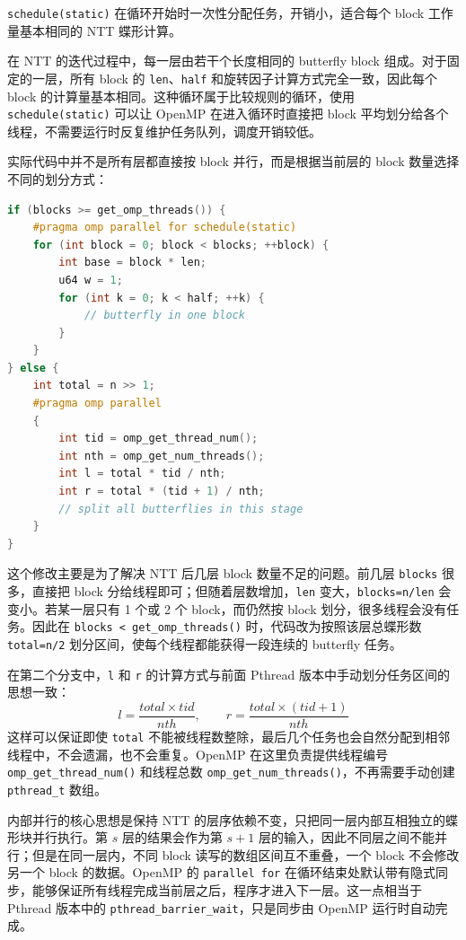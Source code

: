 \documentclass[a4paper]{article}
\begin{document}
\texttt{schedule(static)} 在循环开始时一次性分配任务，开销小，适合每个 block 工作量基本相同的 NTT 蝶形计算。

在 NTT 的迭代过程中，每一层由若干个长度相同的 butterfly block 组成。对于固定的一层，所有 block 的 \texttt{len}、\texttt{half} 和旋转因子计算方式完全一致，因此每个 block 的计算量基本相同。这种循环属于比较规则的循环，使用 \texttt{schedule(static)} 可以让 OpenMP 在进入循环时直接把 block 平均划分给各个线程，不需要运行时反复维护任务队列，调度开销较低。

实际代码中并不是所有层都直接按 block 并行，而是根据当前层的 block 数量选择不同的划分方式：

\begin{lstlisting}[title=根据 block 数量选择并行粒度,frame=trbl,language={C++}]
if (blocks >= get_omp_threads()) {
    #pragma omp parallel for schedule(static)
    for (int block = 0; block < blocks; ++block) {
        int base = block * len;
        u64 w = 1;
        for (int k = 0; k < half; ++k) {
            // butterfly in one block
        }
    }
} else {
    int total = n >> 1;
    #pragma omp parallel
    {
        int tid = omp_get_thread_num();
        int nth = omp_get_num_threads();
        int l = total * tid / nth;
        int r = total * (tid + 1) / nth;
        // split all butterflies in this stage
    }
}
\end{lstlisting}

这个修改主要是为了解决 NTT 后几层 block 数量不足的问题。前几层 \texttt{blocks} 很多，直接把 block 分给线程即可；但随着层数增加，\texttt{len} 变大，\texttt{blocks=n/len} 会变小。若某一层只有 1 个或 2 个 block，而仍然按 block 划分，很多线程会没有任务。因此在 \texttt{blocks < get\_omp\_threads()} 时，代码改为按照该层总蝶形数 \texttt{total=n/2} 划分区间，使每个线程都能获得一段连续的 butterfly 任务。

在第二个分支中，\texttt{l} 和 \texttt{r} 的计算方式与前面 Pthread 版本中手动划分任务区间的思想一致：
\[
l=\frac{total\times tid}{nth},\qquad r=\frac{total\times(tid+1)}{nth}
\]
这样可以保证即使 \texttt{total} 不能被线程数整除，最后几个任务也会自然分配到相邻线程中，不会遗漏，也不会重复。OpenMP 在这里负责提供线程编号 \texttt{omp\_get\_thread\_num()} 和线程总数 \texttt{omp\_get\_num\_threads()}，不再需要手动创建 \texttt{pthread\_t} 数组。

内部并行的核心思想是保持 NTT 的层序依赖不变，只把同一层内部互相独立的蝶形块并行执行。第 $s$ 层的结果会作为第 $s+1$ 层的输入，因此不同层之间不能并行；但是在同一层内，不同 block 读写的数组区间互不重叠，一个 block 不会修改另一个 block 的数据。OpenMP 的 \texttt{parallel for} 在循环结束处默认带有隐式同步，能够保证所有线程完成当前层之后，程序才进入下一层。这一点相当于 Pthread 版本中的 \texttt{pthread\_barrier\_wait}，只是同步由 OpenMP 运行时自动完成。
\end{document}
